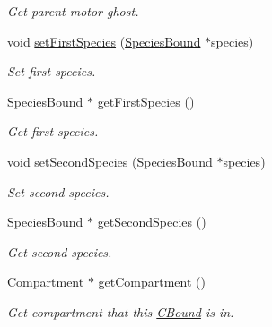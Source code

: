 \begin{DoxyCompactItemize}
\begin{DoxyCompactList}\small\item\em Get parent motor ghost. \end{DoxyCompactList}\item 
void \hyperlink{classCBound_a17d4b84d683b0b7bd75b793410fed18f}{set\+First\+Species} (\hyperlink{classSpeciesBound}{Species\+Bound} $\ast$species)
\begin{DoxyCompactList}\small\item\em Set first species. \end{DoxyCompactList}\item 
\hyperlink{classSpeciesBound}{Species\+Bound} $\ast$ \hyperlink{classCBound_aad60656a671e4ffdc45b4c904fa7c320}{get\+First\+Species} ()
\begin{DoxyCompactList}\small\item\em Get first species. \end{DoxyCompactList}\item 
void \hyperlink{classCBound_a01badbb54867fb99b6f3a895d555867a}{set\+Second\+Species} (\hyperlink{classSpeciesBound}{Species\+Bound} $\ast$species)
\begin{DoxyCompactList}\small\item\em Set second species. \end{DoxyCompactList}\item 
\hyperlink{classSpeciesBound}{Species\+Bound} $\ast$ \hyperlink{classCBound_a1e706b6472c40ae1d98a64eda0acdadf}{get\+Second\+Species} ()
\begin{DoxyCompactList}\small\item\em Get second species. \end{DoxyCompactList}\item 
\hyperlink{classCompartment}{Compartment} $\ast$ \hyperlink{classCBound_a6c4d7b1b35d06725c8659424bf0c3f18}{get\+Compartment} ()
\begin{DoxyCompactList}\small\item\em Get compartment that this \hyperlink{classCBound}{C\+Bound} is in. \end{DoxyCompactList}\end{DoxyCompactItemize}
